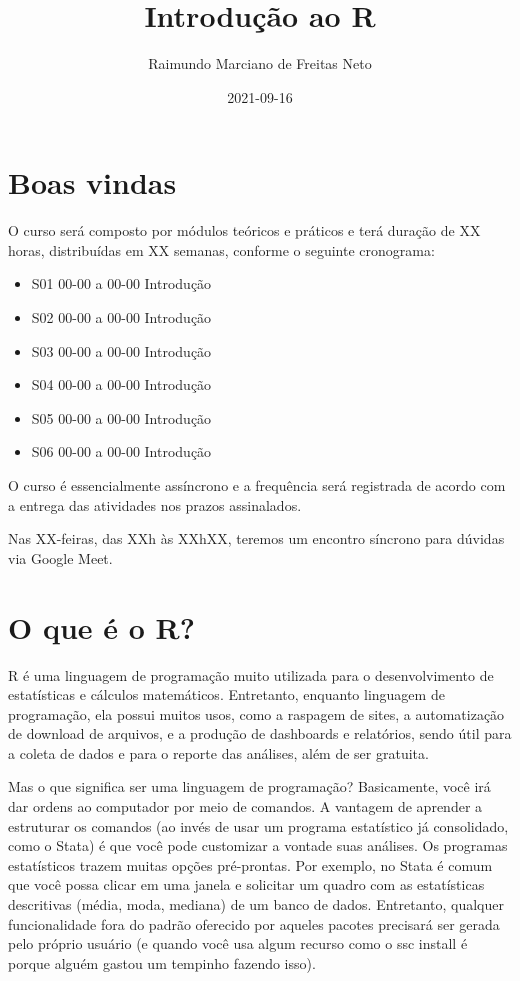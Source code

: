 \documentclass[
]{book}
\title{Introdução ao R}
\author{Raimundo Marciano de Freitas Neto}
\date{2021-09-16}
\providecommand{\tightlist}{%
  \setlength{\itemsep}{0pt}\setlength{\parskip}{0pt}}
\begin{document}
\maketitle

{
\setcounter{tocdepth}{1}
\tableofcontents
}
\hypertarget{boas-vindas}{%
\chapter{Boas vindas}\label{boas-vindas}}

O curso será composto por módulos teóricos e práticos e terá duração de XX horas, distribuídas em XX semanas, conforme o seguinte cronograma:

\begin{itemize}
\tightlist
\item
  S01 00-00 a 00-00 Introdução
\item
  S02 00-00 a 00-00 Introdução
\item
  S03 00-00 a 00-00 Introdução
\item
  S04 00-00 a 00-00 Introdução
\item
  S05 00-00 a 00-00 Introdução
\item
  S06 00-00 a 00-00 Introdução
\end{itemize}

O curso é essencialmente assíncrono e a frequência será registrada de acordo com a entrega das atividades nos prazos assinalados.

Nas XX-feiras, das XXh às XXhXX, teremos um encontro síncrono para dúvidas via Google Meet.

\hypertarget{intro}{%
\chapter{O que é o R?}\label{intro}}

R é uma linguagem de programação muito utilizada para o desenvolvimento de estatísticas e cálculos matemáticos. Entretanto, enquanto linguagem de programação, ela possui muitos usos, como a raspagem de sites, a automatização de download de arquivos, e a produção de dashboards e relatórios, sendo útil para a coleta de dados e para o reporte das análises, além de ser gratuita.

Mas o que significa ser uma linguagem de programação? Basicamente, você irá dar ordens ao computador por meio de comandos. A vantagem de aprender a estruturar os comandos (ao invés de usar um programa estatístico já consolidado, como o Stata) é que você pode customizar a vontade suas análises. Os programas estatísticos trazem muitas opções pré-prontas. Por exemplo, no Stata é comum que você possa clicar em uma janela e solicitar um quadro com as estatísticas descritivas (média, moda, mediana) de um banco de dados. Entretanto, qualquer funcionalidade fora do padrão oferecido por aqueles pacotes precisará ser gerada pelo próprio usuário (e quando você usa algum recurso como o ssc install é porque alguém gastou um tempinho fazendo isso).
\end{document}

